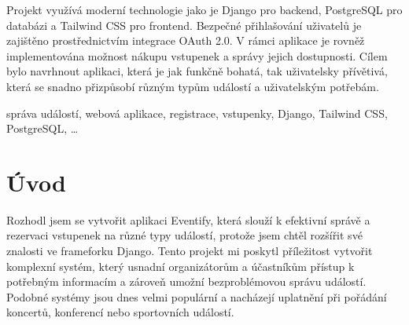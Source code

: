 \documentclass[12pt, a4paper,
twoside,        %
openright
]{report}
\begin{document}
	Projekt využívá moderní technologie jako je Django pro backend, PostgreSQL pro databázi a Tailwind CSS pro frontend. Bezpečné přihlašování uživatelů je zajištěno prostřednictvím \linebreak integrace OAuth 2.0. V rámci aplikace je rovněž implementována možnost nákupu vstupenek \linebreak a správy jejich dostupnosti. Cílem bylo navrhnout aplikaci, která je jak funkčně bohatá, tak uživatelsky přívětivá, která se snadno přizpůsobí různým typům událostí a uživatelským potřebám.
	
	
	
	\vspace{18pt}
	
	
	\noindent správa událostí, webová aplikace, registrace, vstupenky, Django, Tailwind CSS, \\PostgreSQL, \dots 
	
	\vspace{18pt}

	\clearpage %

	
	\tableofcontents %
	\clearpage

	\chapter*{Úvod}
Rozhodl jsem se vytvořit aplikaci Eventify, která slouží k efektivní správě a rezervaci vstupenek na různé typy událostí, protože jsem chtěl rozšířit své znalosti ve frameforku Django. Tento projekt mi poskytl příležitost vytvořit komplexní systém, který usnadní organizátorům \linebreak a účastníkům přístup k potřebným informacím a zároveň umožní bezproblémovou správu událostí. Podobné systémy jsou dnes velmi populární a nacházejí uplatnění při pořádání koncertů, konferencí nebo sportovních událostí.
\end{document}
